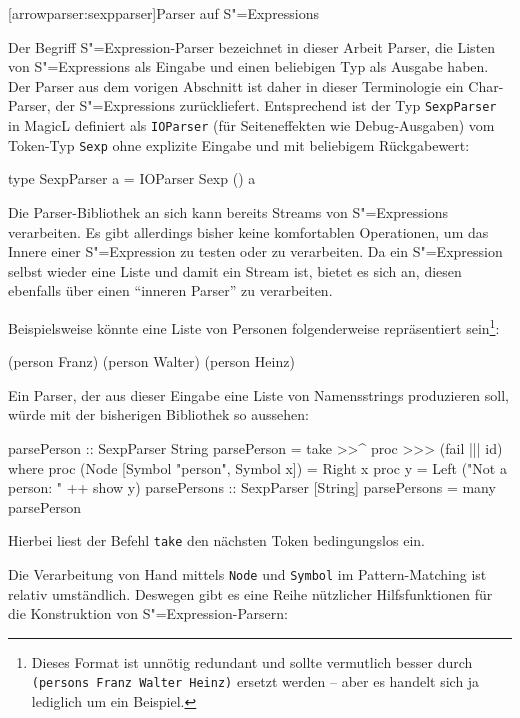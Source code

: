 \documentclass[12pt, a4paper, bibgerm]{scrbook}
\newenvironment{DIFnomarkup}{}{}
\newcommand\icode[1]{\lstinline?#1?}
\newcommand\lsection{}
\newcommand{\sexp}{S"=Expression}
\newcommand{\sexps}{S"=Expressions}
\begin{document}
\lsection[arrowparser:sexpparser]{Parser auf \sexps}

Der Begriff \sexp{}-Parser bezeichnet in dieser Arbeit Parser, die
Listen von \sexps{} als Eingabe und einen beliebigen Typ als Ausgabe
haben. Der Parser aus dem vorigen Abschnitt ist daher in dieser
Terminologie ein Char-Parser, der \sexps{} zurückliefert. Entsprechend
ist der Typ \icode{SexpParser} in MagicL definiert als \icode{IOParser} (für
Seiteneffekten wie Debug-Ausgaben) vom Token-Typ \icode{Sexp} ohne
explizite Eingabe und mit beliebigem Rückgabewert:
\begin{DIFnomarkup}\begin{code}
type SexpParser a = IOParser Sexp () a  
\end{code}\end{DIFnomarkup}
Die Parser-Bibliothek an sich kann bereits Streams von \sexps{}
verarbeiten. Es gibt allerdings bisher keine komfortablen Operationen,
um das Innere einer \sexp{} zu testen oder zu verarbeiten. Da ein
\sexp{} selbst wieder eine Liste und damit ein Stream ist, bietet es
sich an, diesen ebenfalls über einen "`inneren Parser"' zu verarbeiten.

Beispielsweise könnte eine Liste von Personen folgenderweise
repräsentiert sein\footnote{Dieses Format ist unnötig redundant und
  sollte vermutlich besser durch \icode{(persons Franz Walter Heinz)}
  ersetzt werden -- aber es handelt sich ja lediglich um ein Beispiel.}:
\begin{DIFnomarkup}\begin{code}
(person Franz)
(person Walter)
(person Heinz)
\end{code}\end{DIFnomarkup}

Ein Parser, der aus dieser Eingabe eine Liste von Namensstrings
produzieren soll, würde mit der bisherigen Bibliothek so aussehen:

\begin{DIFnomarkup}\begin{code}
parsePerson :: SexpParser String
parsePerson = take >>^ proc >>> (fail ||| id)
  where proc (Node [Symbol "person", Symbol x]) = Right x
        proc y = Left ("Not a person: " ++ show y)
parsePersons :: SexpParser [String]
parsePersons = many parsePerson
\end{code}\end{DIFnomarkup} %
Hierbei liest der Befehl \icode{take} den nächsten Token bedingungslos
ein.

Die Verarbeitung von Hand mittels \icode{Node} und \icode{Symbol} im
Pattern-Matching ist relativ umständlich. Deswegen gibt es eine Reihe
nützlicher Hilfsfunktionen für die Konstruktion von \sexp{}-Parsern:
\end{document}
